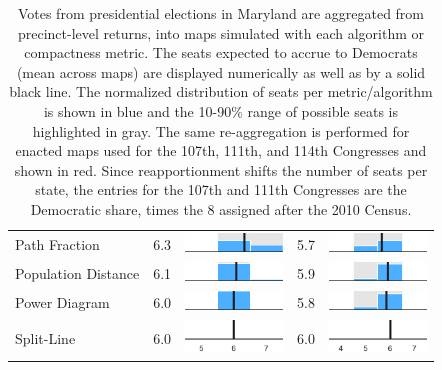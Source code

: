 \begin{table}
\begin{tabular}{l rm{7em} rm{7em}}
Path Fraction          &   6.3 &    \includegraphics[width=7em]{mini_hist/MD_2008_path_frac} &   5.7 &    \includegraphics[width=7em]{mini_hist/MD_2016_path_frac} \\
Population Distance    &   6.1 &       \includegraphics[width=7em]{mini_hist/MD_2008_dist_p} &   5.9 &       \includegraphics[width=7em]{mini_hist/MD_2016_dist_p} \\
Power Diagram          &   6.0 &        \includegraphics[width=7em]{mini_hist/MD_2008_power} &   5.8 &        \includegraphics[width=7em]{mini_hist/MD_2016_power} \\
Split-Line             &   6.0 &        \includegraphics[width=7em]{mini_hist/MD_2008_split_ax} &   6.0 &        \includegraphics[width=7em]{mini_hist/MD_2016_split_ax} \\
\hline \hline
\end{tabular}
\caption{Votes from presidential elections in Maryland are aggregated from precinct-level returns, into maps simulated with each algorithm or compactness metric. 
             The seats expected to accrue to Democrats (mean across maps) are displayed numerically as well as by a solid black line.
             The normalized distribution of seats per metric/algorithm is shown in blue and the 10-90\% range of possible seats is highlighted in gray.
             The same re-aggregation is performed for enacted maps used for the 107th, 111th, and 114th Congresses and shown in red.
             Since reapportionment shifts the number of seats per state,
               the entries for the 107th and 111th Congresses are the Democratic share,
               times the 8 assigned after the 2010 Census.
             }\label{tab:MD_seats}
\end{table}
 